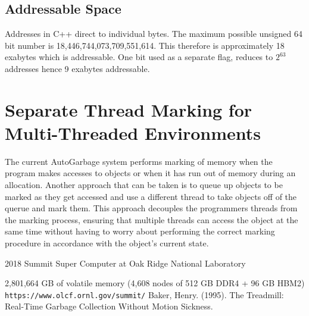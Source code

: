 \documentclass[11pt]{article}
\begin{document}
\subsection{Addressable Space}
\label{app:addessablespace}
Addresses in C++ direct to individual bytes. The maximum possible unsigned 64 bit number is
18,446,744,073,709,551,614. This therefore is approximately 18 exabytes which is addressable. One bit
used as a separate flag, reduces to $2^{63}$ addresses hence 9 exabytes addressable.

\section{Separate Thread Marking for Multi-Threaded Environments}
\label{app:multithreadedmarking}
The current AutoGarbage system performs marking of memory when the program makes accesses to objects
or when it has run out of memory during an allocation. Another approach that can be taken is to 
queue up objects to be marked as they get accessed and use a different thread to take objects off of the querue
and mark them. This approach decouples the programmers threads from the marking process, ensuring that multiple threads
can access the object at the same time without having to worry about performing the correct marking
procedure in accordance with the object's current state.

\newpage
\begin{thebibliography}{9}
2018 Summit Super Computer at Oak Ridge National Laboratory

2,801,664 GB of volatile memory (4,608 nodes of 512 GB DDR4 + 96 GB HBM2)
\texttt{https://www.olcf.ornl.gov/summit/}
Baker, Henry. (1995). The Treadmill: Real-Time Garbage Collection Without Motion Sickness. 


\end{thebibliography}
\end{document}
